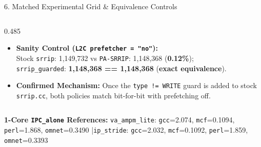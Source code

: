 \documentclass[aspectratio=169, 10pt]{beamer}
\begin{document}
\begin{frame}{6. Matched Experimental Grid \& Equivalence Controls}
\begin{columns}[t, onlytextwidth]
\begin{column}{0.485\textwidth}
\begin{tcolorbox}[tealpanel]
\begin{itemize}
          \item \textbf{Sanity Control (\texttt{L2C prefetcher = "no"}):}\\
            Stock \texttt{srrip}: 1,149,732 vs \texttt{PA-SRRIP}: 1,148,368 (\textbf{0.12\%});\\
            \texttt{srrip\_guarded}: \textbf{1,148,368 == 1,148,368} (\textbf{exact equivalence}).
          \item \textbf{Confirmed Mechanism:} Once the \texttt{type != WRITE} guard is added to stock \texttt{srrip.cc}, both policies match bit-for-bit with prefetching off.
        \end{itemize}
      \end{tcolorbox}
    \end{column}
  \end{columns}

  \vspace{0.16cm}
  \begin{tcolorbox}[summarystrip]
    \centering\scriptsize
    \textbf{\color{NavyPrimary}1-Core \texttt{IPC\_alone} References:} \quad \texttt{va\_ampm\_lite}: \texttt{gcc}=2.074, \texttt{mcf}=0.1094, \texttt{perl}=1.868, \texttt{omnet}=0.3490 \quad|\quad \texttt{ip\_stride}: \texttt{gcc}=2.032, \texttt{mcf}=0.1092, \texttt{perl}=1.859, \texttt{omnet}=0.3393
  \end{tcolorbox}
\end{frame}
\end{document}
